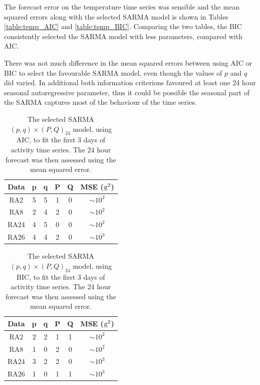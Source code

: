 \documentclass[]{article}
\begin{document}
The forecast error on the temperature time series was sensible and the mean squared errors along with the selected SARMA model is shown in Tables \ref{table:temp_AIC} and \ref{table:temp_BIC}. Comparing the two tables, the BIC consistently selected the SARMA model with less parameters, compared with AIC.

There was not much difference in the mean squared errors between using AIC or BIC to select the favourable SARMA model, even though the values of $p$ and $q$ did varied. In additional both information criterions favoured at least one 24 hour seasonal autoregressive parameter, thus it could be possible the seasonal part of the SARMA captures most of the behaviour of the time series.

\begin{table}[htbp]
\begin{center}
\begin{tabular}{ cccccc } 
 Data & p & q & P & Q & MSE ($\textup{g}^2$)\\
  \hline
 RA2 & 5 & 5 & 1 & 0 & $\sim10^2$\\
 RA8 & 2 & 4 & 2 & 0 & $\sim10^2$\\
 RA24& 4 & 5 & 0 & 0 & $\sim10^2$\\
 RA26& 4 & 4 & 2 & 0 & $\sim10^3$\\
\end{tabular}
\end{center}
\caption{The selected SARMA$(p,q)\times(P,Q)_{24}$ model, using AIC, to fit the first 3 days of activity time series. The 24 hour forecast was then assessed using the mean squared error.}
\label{table:ra_AIC}
\end{table}

\begin{table}[htbp]
\begin{center}
\begin{tabular}{ cccccc } 
 Data & p & q & P & Q & MSE ($\textup{g}^2$)\\
  \hline
 RA2 & 2 & 2 & 1 & 1 & $\sim10^2$\\
 RA8 & 1 & 0 & 2 & 0 & $\sim10^2$\\
 RA24& 3 & 2 & 2 & 0 & $\sim10^3$\\
 RA26& 1 & 0 & 1 & 1 & $\sim10^3$\\
\end{tabular}
\end{center}
\caption{The selected SARMA$(p,q)\times(P,Q)_{24}$ model, using BIC, to fit the first 3 days of activity time series. The 24 hour forecast was then assessed using the mean squared error.}
\label{table:ra_BIC}
\end{table}
\end{document}
